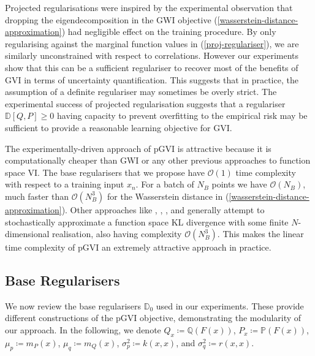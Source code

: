 \documentclass{article}
\newcommand{\vw}[1]{{\color{green} [VW: #1]}}
\numberwithin{equation}{section}
\begin{document}
Projected regularisations were inspired by the experimental observation that dropping the eigendecomposition in the GWI objective (\ref{wasserstein-distance-approximation}) had negligible effect on the training procedure.
By only regularising against the marginal function values in (\ref{proj-regulariser}), we are similarly unconstrained with respect to correlations.
However our experiments show that this can be a sufficient regulariser to recover most of the benefits of GVI in terms of uncertainty quantification. 
This suggests that in practice, the assumption of a definite regulariser may sometimes be overly strict.
The experimental success of projected regularisation suggests that a regulariser $\mathbb{D}[Q, P] \geq 0$ having capacity to prevent overfitting to the empirical risk may be sufficient to provide a reasonable learning objective for GVI.


The experimentally-driven approach of pGVI is attractive because it is computationally cheaper than GWI or any other previous approaches to function space VI.
The base regularisers that we propose have $\mathcal{O}(1)$ time complexity  with respect to a training input $x_n$.
For a batch of $N_B$ points we have $\mathcal{O}(N_B)$, much faster than $\mathcal{O}(N_B^3)$ for the Wasserstein distance in (\ref{wasserstein-distance-approximation}).  
Other approaches like \cite{rudner2020rethinking}, \cite{sun2019functional}, \cite{ma2019variational}, and \cite{ma2021functional} generally attempt to stochastically approximate a function space KL divergence with some finite $N$-dimensional realisation, also having complexity $\mathcal{O}(N_B^3)$. 
This makes the linear time complexity of pGVI an extremely attractive approach in practice.

\subsection{Base Regularisers}
We now review the base regularisers $\mathbb{D}_0$ used in our experiments. 
These provide different constructions of the pGVI objective, demonstrating the modularity of our approach.
In the following, we denote $Q_{x} \coloneqq \mathbb{Q}\left(F(x)\right)$, $P_{x} \coloneqq \mathbb{P}\left(F(x)\right)$, $\mu_p \coloneqq m_P(x)$, $\mu_q \coloneqq m_Q(x)$, $\sigma_p^2 \coloneqq k(x, x)$, and $\sigma_q^2 \coloneqq r(x, x)$.
\end{document}
